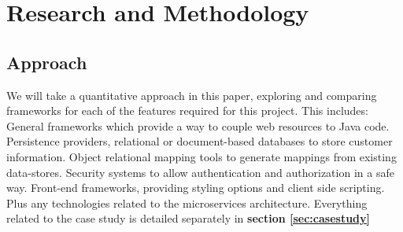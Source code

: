 \documentclass[12pt]{article}
\begin{document}
\section{Research and Methodology}
\begin{multicols}{2}
\subsection{Approach}
We will take a quantitative approach in this paper, exploring and comparing frameworks for each of the features required for this project. This includes: General frameworks which provide a way to couple web resources to Java code. Persistence providers, relational or document-based databases to store customer information. Object relational mapping tools to generate mappings from existing data-stores. Security systems to allow authentication and authorization in a safe way. Front-end frameworks, providing styling options and client side scripting. Plus any technologies related to the microservices architecture. Everything related to the case study is detailed separately in \textbf{section \ref{sec:casestudy}}

\end{multicols}
\end{document}
